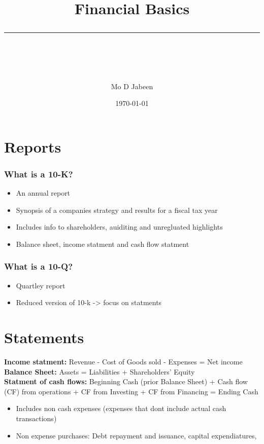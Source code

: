 \documentclass[11pt]{scrartcl} %
\title{	
	\normalfont\normalsize
	\vspace{20pt} %
	{\huge Financial Basics}\\ %
	\vspace{12pt} %
	\rule{\linewidth}{2pt}\\ %
}
\author{\small Mo D Jabeen} %
\date{\normalsize\today} %
\begin{document}
\maketitle %

\tableofcontents

\section{Reports}

\subsubsection{What is a 10-K?}

\begin{itemize}
	\item An annual report
	\item Synopsis of a companies strategy and results for a fiscal tax year
	\item Includes info to shareholders, auiditing and unregluated highlights
	\item Balance sheet, income statment and cash flow statment 
\end{itemize}

\subsubsection{What is a 10-Q?}

\begin{itemize}
	\item Quartley report
	\item Reduced version of 10-k -> focus on statments 
\end{itemize}

\section{Statements}

\textbf{Income statment:} Revenue - Cost of Goods sold - Expenses = Net income \\
\textbf{Balance Sheet:} Assets = Liabilities + Shareholders' Equity\\
\textbf{Statment of cash flows:} Beginning Cash (prior Balance Sheet) + Cash flow (CF) from operations + CF from Investing + CF from Financing = Ending Cash

\begin{itemize}
	\item Includes non cash expenses (expenses that dont include actual cash transactions)
	\item Non expense purchases: Debt repayment and issuance, capital expendiatures, 
\end{itemize}
\end{document}
